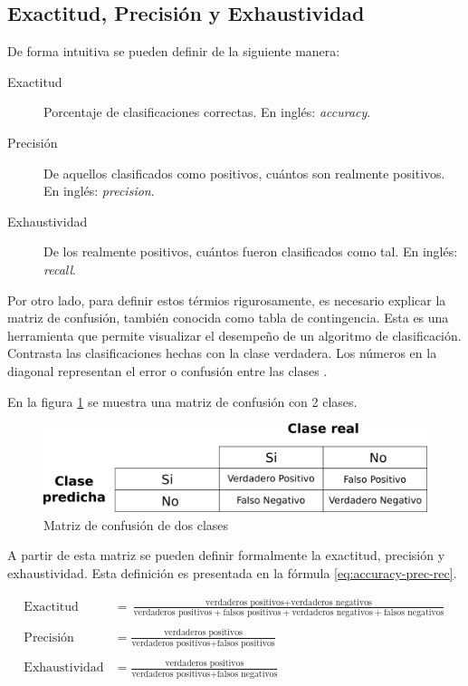 \subsection{Exactitud, Precisión y Exhaustividad}

De forma intuitiva se pueden definir de la siguiente manera:

\begin{description}
	\item [Exactitud] Porcentaje de clasificaciones correctas. En inglés: \textit{accuracy}.
	\item [Precisión] De aquellos clasificados como positivos, cuántos son realmente positivos. En inglés: \textit{precision}.
	\item [Exhaustividad] De los realmente positivos, cuántos fueron clasificados como tal. En inglés: \textit{recall}.
\end{description}

Por otro lado, para definir estos térmios rigurosamente, es necesario explicar la matriz de confusión, también conocida como tabla de contingencia. Esta es una herramienta que permite visualizar el desempeño de un algoritmo de clasificación. Contrasta las clasificaciones hechas con la clase verdadera. Los números en la diagonal representan el error o confusión entre las clases \citep{fawcett2006introduction}.

En la figura \ref{fig:confussion2} se muestra una matriz de confusión con 2 clases.

\begin{figure}[htbp]
	\centering
	\includegraphics[width=0.6\linewidth]{graficos/propios/matriz_confusion.png}
	\caption{Matriz de confusión de dos clases}
	\label{fig:confussion2}
\end{figure}

A partir de esta matriz se pueden definir formalmente la exactitud, precisión y exhaustividad. Esta definición es presentada en la fórmula \ref{eq:accuracy-prec-rec}.

\begin{equation}
	\label{eq:accuracy-prec-rec}
\begin{split}
	\text{Exactitud} &= \frac{\text{verdaderos positivos} + \text{verdaderos negativos}}{\text{verdaderos positivos} + \text{falsos positivos} + \text{verdaderos negativos} + \text{falsos negativos}} \\\\
	\text{Precisión} &= \frac{\text{verdaderos positivos}}{\text{verdaderos positivos} + \text{falsos positivos}} \\\\
	\text{Exhaustividad} &= \frac{\text{verdaderos positivos}}{\text{verdaderos positivos} + \text{falsos negativos}}
\end{split}
\end{equation}

